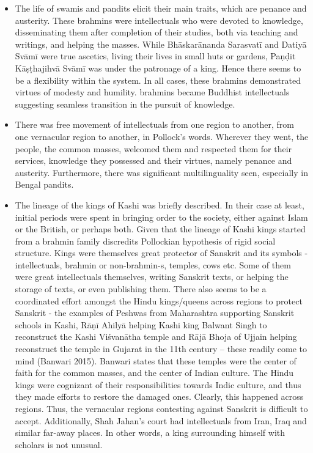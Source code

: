 \begin{itemize}
\itemsep=0pt
\item The life of swamis and pandits elicit their main traits, which are penance and austerity. These brahmins were intellectuals who were devoted to knowledge, disseminating them after completion of their studies, both via teaching and writings, and helping the masses. While Bhāskarānanda Sarasvatī and Datiyā Svāmī were true ascetics, living their lives in small huts or gardens, Paṇḍit Kāṣṭhajihvā Svāmī was under the patronage of a king. Hence there seems to be a flexibility within the system. In all cases, these brahmins demonstrated virtues of modesty and humility. brahmins became Buddhist intellectuals suggesting seamless transition in the pursuit of knowledge.

 \item There was free movement of intellectuals from one region to another, from one vernacular region to another, in Pollock's words. Wherever they went, the people, the common masses, welcomed them and respected them for their services, knowledge they possessed and their virtues, namely penance and austerity. Furthermore, there was significant multilinguality seen, especially in Bengal pandits.

 \item The lineage of the kings of Kashi was briefly described. In their case at least, initial periods were spent in bringing order to the society, either against Islam or the British, or perhaps both. Given that the lineage of Kashi kings started from a brahmin family discredits Pollockian hypothesis of rigid social structure. Kings were themselves great protector of Sanskrit and its symbols - intellectuals, brahmin or non-brahmin-s, temples, cows etc. Some of them were great intellectuals themselves, writing Sanskrit texts, or helping the storage of texts, or even publishing them. There also seems to be a coordinated effort amongst the Hindu kings/queens across regions to protect Sanskrit - the examples of Peshwas from Maharashtra supporting Sanskrit schools in Kashi, Rāṇī Ahilyā helping Kashi king Balwant Singh to reconstruct the Kashi Viśvanātha temple and Rājā Bhoja of Ujjain helping reconstruct the temple in Gujarat in the 11th century – these readily come to mind (Banwari 2015). Banwari states that these temples were the center of faith for the common masses, and the center of Indian culture. The Hindu kings were cognizant of their responsibilities towards Indic culture, and thus they made efforts to restore the damaged ones. Clearly, this happened across regions. Thus, the vernacular regions contesting against Sanskrit is difficult to accept. Additionally, Shah Jahan’s court had intellectuals from Iran, Iraq and similar far-away places. In other words, a king surrounding himself with scholars is not unusual.

\end{itemize}

